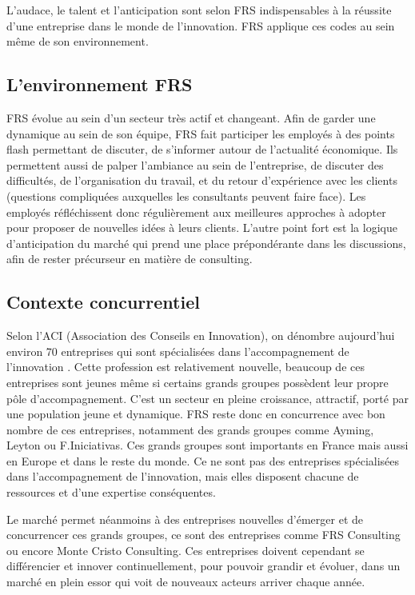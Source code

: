 \documentclass[french]{article}
\begin{document}
{L'audace, le talent et l'anticipation sont selon FRS indispensables à la réussite d'une entreprise dans le monde de l'innovation. FRS applique ces codes au sein même de son environnement.

\subsection{L'environnement FRS}

FRS évolue au sein d'un secteur très actif et changeant.
Afin de garder une dynamique au sein de son équipe, FRS fait participer les employés à des points flash permettant de discuter, de s'informer autour de l'actualité économique. Ils permettent aussi de palper l'ambiance au sein de l'entreprise, de discuter des difficultés, de l'organisation du travail, et du retour d'expérience avec les clients (questions compliquées auxquelles les consultants peuvent faire face). Les employés réfléchissent donc régulièrement aux meilleures approches à adopter pour proposer de nouvelles idées à leurs clients.
\newline{}
L'autre point fort est la logique d'anticipation du marché qui prend une place prépondérante dans les discussions, afin de rester précurseur en matière de consulting.

\subsection{Contexte concurrentiel}

Selon l'ACI (Association des Conseils en Innovation), on dénombre aujourd'hui environ 70 entreprises qui sont spécialisées dans l'accompagnement de l'innovation \cite{aci}. Cette profession est relativement nouvelle, beaucoup de ces entreprises sont jeunes même si certains grands groupes possèdent leur propre pôle d'accompagnement. C'est un secteur en pleine croissance, attractif, porté par une population jeune et dynamique.
\newline{}
FRS reste donc en concurrence avec bon nombre de ces entreprises, notamment des grands groupes comme Ayming, Leyton ou F.Iniciativas. Ces grands groupes sont importants en France mais aussi en Europe et dans le reste du monde. Ce ne sont pas des entreprises spécialisées dans l'accompagnement de l'innovation, mais elles disposent chacune de ressources et d'une expertise conséquentes.

Le marché permet néanmoins à des entreprises nouvelles d'émerger et de concurrencer ces grands groupes, ce sont des entreprises comme FRS Consulting ou encore Monte Cristo Consulting. Ces entreprises doivent cependant se différencier et innover continuellement, pour pouvoir grandir et évoluer, dans un marché en plein essor qui voit de nouveaux acteurs arriver chaque année.

}
\end{document}

